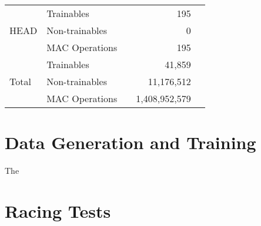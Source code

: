 \begin{table}[h]
\begin{tabular}{|l|l|r|r|r|}
\multirow{3}{*}{HEAD}   &Trainables             &               &195            &           \\\cline{2-\numColumns}
                        &Non-trainables         &               &0              &           \\\cline{2-\numColumns}
                        &MAC Operations         &               &195            &           \\\hline\hline
\multirow{3}{*}{Total}  &Trainables             &               &41,859         &           \\\cline{2-\numColumns}
                        &Non-trainables         &               &11,176,512     &           \\\cline{2-\numColumns}
                        &MAC Operations         &               &1,408,952,579  &           \\\hline

    \end{tabular}
\end{table}

\section{Data Generation and Training}
The 

\section{Racing Tests}
